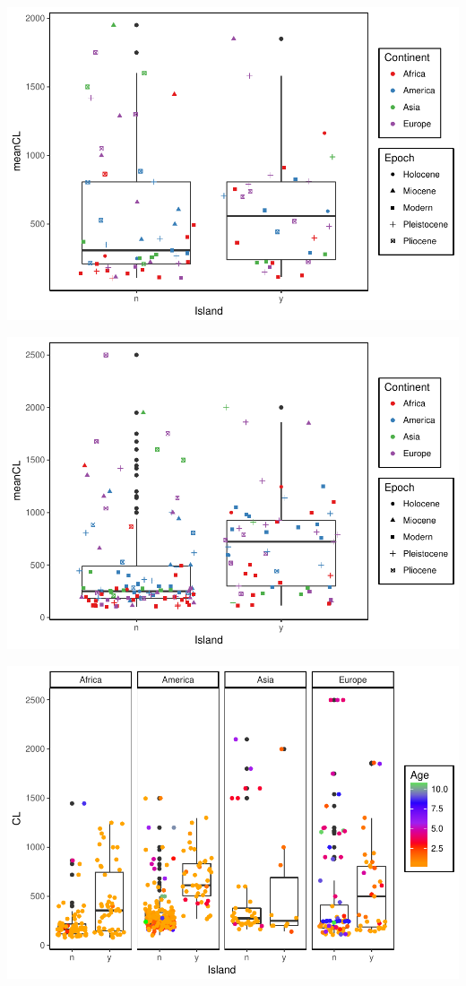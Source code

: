 \documentclass[]{article}
\begin{document}
\includegraphics{MA_JJ_files/figure-latex/Boxplot continental vs. insular, species summarised-1.pdf}

\includegraphics{MA_JJ_files/figure-latex/Boxplots, species summarised-1.pdf}

\includegraphics{MA_JJ_files/figure-latex/unnamed-chunk-2-1.pdf}
\end{document}
